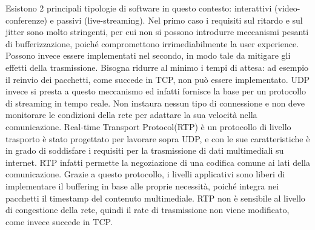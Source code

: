 Esistono 2 principali tipologie di software in questo contesto: interattivi (video-conferenze) e passivi (live-streaming). Nel primo caso i requisiti sul ritardo
e sul jitter sono molto stringenti, per cui non si possono introdurre meccanismi pesanti di bufferizzazione, poiché compromettono irrimediabilmente la user experience. Possono invece essere implementati nel secondo, in modo tale da mitigare gli effetti della trasmissione. Bisogna ridurre al minimo i tempi di attesa: ad esempio il reinvio dei pacchetti, come succede in TCP, non può essere implementato. UDP invece si presta a questo meccanismo ed infatti fornisce la base per un protocollo di streaming in tempo reale. Non instaura nessun tipo di connessione e non deve monitorare le condizioni della rete per adattare la sua velocità nella comunicazione. Real-time Transport Protocol(RTP) è un protocollo di livello trasporto \cite{a8rfc3550}%
è stato progettato per lavorare sopra UDP, e con le sue caratteristiche è in grado di soddisfare i requisiti per la trasmissione di dati multimediali su internet. RTP infatti permette la negoziazione di una codifica comune ai lati della comunicazione. Grazie a questo protocollo, i livelli applicativi sono liberi di implementare il buffering in base alle proprie necessità, poiché integra nei pacchetti il timestamp del contenuto multimediale. RTP non è sensibile al livello di congestione della rete, quindi il rate di trasmissione non viene modificato, come invece succede in TCP. %

